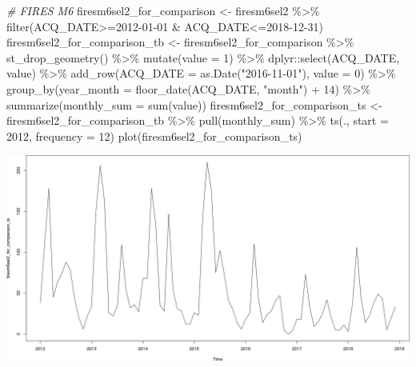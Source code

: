 \documentclass[10pt,landscape,a3paper]{article}
\newenvironment{Shaded}{\begin{snugshade}}{\end{snugshade}}
\newcommand{\AttributeTok}[1]{\textcolor[rgb]{0.77,0.63,0.00}{#1}}
\newcommand{\CommentTok}[1]{\textcolor[rgb]{0.56,0.35,0.01}{\textit{#1}}}
\newcommand{\DecValTok}[1]{\textcolor[rgb]{0.00,0.00,0.81}{#1}}
\newcommand{\FunctionTok}[1]{\textcolor[rgb]{0.00,0.00,0.00}{#1}}
\newcommand{\NormalTok}[1]{#1}
\newcommand{\OtherTok}[1]{\textcolor[rgb]{0.56,0.35,0.01}{#1}}
\newcommand{\SpecialCharTok}[1]{\textcolor[rgb]{0.00,0.00,0.00}{#1}}
\newcommand{\StringTok}[1]{\textcolor[rgb]{0.31,0.60,0.02}{#1}}
\begin{document}
\begin{Shaded}
\begin{Highlighting}[]
\CommentTok{\# FIRES M6}
\NormalTok{firesm6sel2\_for\_comparison }\OtherTok{\textless{}{-}}\NormalTok{ firesm6sel2 }\SpecialCharTok{\%\textgreater{}\%} 
  \FunctionTok{filter}\NormalTok{(ACQ\_DATE}\SpecialCharTok{\textgreater{}=}\StringTok{\textquotesingle{}2012{-}01{-}01\textquotesingle{}} \SpecialCharTok{\&}\NormalTok{ ACQ\_DATE}\SpecialCharTok{\textless{}=}\StringTok{\textquotesingle{}2018{-}12{-}31\textquotesingle{}}\NormalTok{)}
\NormalTok{firesm6sel2\_for\_comparison\_tb }\OtherTok{\textless{}{-}}\NormalTok{ firesm6sel2\_for\_comparison }\SpecialCharTok{\%\textgreater{}\%} 
  \FunctionTok{st\_drop\_geometry}\NormalTok{() }\SpecialCharTok{\%\textgreater{}\%} 
  \FunctionTok{mutate}\NormalTok{(}\AttributeTok{value =} \DecValTok{1}\NormalTok{) }\SpecialCharTok{\%\textgreater{}\%} 
\NormalTok{  dplyr}\SpecialCharTok{::}\FunctionTok{select}\NormalTok{(ACQ\_DATE, value) }\SpecialCharTok{\%\textgreater{}\%} 
  \FunctionTok{add\_row}\NormalTok{(}\AttributeTok{ACQ\_DATE =} \FunctionTok{as.Date}\NormalTok{(}\StringTok{"2016{-}11{-}01"}\NormalTok{), }\AttributeTok{value =} \DecValTok{0}\NormalTok{) }\SpecialCharTok{\%\textgreater{}\%} 
  \FunctionTok{group\_by}\NormalTok{(}\AttributeTok{year\_month =} \FunctionTok{floor\_date}\NormalTok{(ACQ\_DATE, }\StringTok{"month"}\NormalTok{) }\SpecialCharTok{+} \DecValTok{14}\NormalTok{) }\SpecialCharTok{\%\textgreater{}\%}
  \FunctionTok{summarize}\NormalTok{(}\AttributeTok{monthly\_sum =} \FunctionTok{sum}\NormalTok{(value))}
\NormalTok{firesm6sel2\_for\_comparison\_ts }\OtherTok{\textless{}{-}}\NormalTok{ firesm6sel2\_for\_comparison\_tb }\SpecialCharTok{\%\textgreater{}\%} 
  \FunctionTok{pull}\NormalTok{(monthly\_sum) }\SpecialCharTok{\%\textgreater{}\%} 
  \FunctionTok{ts}\NormalTok{(., }\AttributeTok{start =} \DecValTok{2012}\NormalTok{, }\AttributeTok{frequency =} \DecValTok{12}\NormalTok{)}
\FunctionTok{plot}\NormalTok{(firesm6sel2\_for\_comparison\_ts)}
\end{Highlighting}
\end{Shaded}

\begin{center}\includegraphics[width=0.75\linewidth]{img/data-download-preparation-eda/unnamed-chunk-1-1} \end{center}
\end{document}
